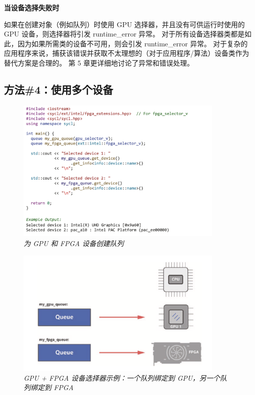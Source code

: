 \textbf{当设备选择失败时}

如果在创建对象（例如队列）时使用 GPU 选择器，并且没有可供运行时使用的 GPU 设备，则选择器将引发 runtime\_error 异常。 
对于所有设备选择器类都是如此，因为如果所需类的设备不可用，则会引发 runtime\_error 异常。 
对于复杂的应用程序来说，捕获该错误并获取不太理想的（对于应用程序/算法）设备类作为替代方案是合理的。 
第 5 章更详细地讨论了异常和错误处理。

\subsection{方法\#4：使用多个设备}
\begin{figure}[H]
	\centering
	\includegraphics[width=0.9\textwidth]{figs/F2.13.png}
	\caption{\textit{为 GPU 和 FPGA 设备创建队列}}
\end{figure}

\begin{figure}[H]
	\centering
	\includegraphics[width=0.9\textwidth]{figs/F2.14.png}
	\caption{\textit{GPU + FPGA 设备选择器示例：一个队列绑定到 GPU，另一个队列绑定到 FPGA}}
\end{figure}

